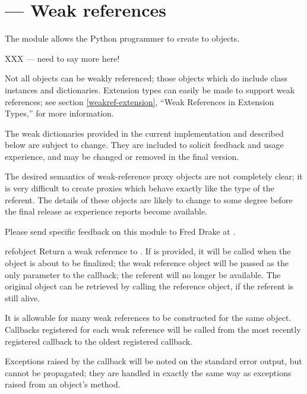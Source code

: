 \section{ ---
         Weak references}




The  module allows the Python programmer to create
 to objects.

XXX --- need to say more here!

Not all objects can be weakly referenced; those objects which do
include class instances and dictionaries.  Extension types can easily
be made to support weak references; see section \ref{weakref-extension},
``Weak References in Extension Types,'' for more information.


The weak dictionaries provided in the current implementation and
described below are subject to change.  They are included to solicit
feedback and usage experience, and may be changed or removed in the
final version.

The desired semantics of weak-reference proxy objects are not
completely clear; it is very difficult to create proxies which behave
exactly like the type of the referent.  The details of these objects
are likely to change to some degree before the final release as
experience reports become available.

Please send specific feedback on this module to Fred Drake at
.


\begin{funcdesc}{ref}{object}
  Return a weak reference to .  If  is
  provided, it will be called when the object is about to be
  finalized; the weak reference object will be passed as the only
  parameter to the callback; the referent will no longer be available.
  The original object can be retrieved by calling the reference
  object, if the referent is still alive.

  It is allowable for many weak references to be constructed for the
  same object.  Callbacks registered for each weak reference will be
  called from the most recently registered callback to the oldest
  registered callback.

  Exceptions raised by the callback will be noted on the standard
  error output, but cannot be propagated; they are handled in exactly
  the same way as exceptions raised from an object's
   method.
\end{funcdesc}

